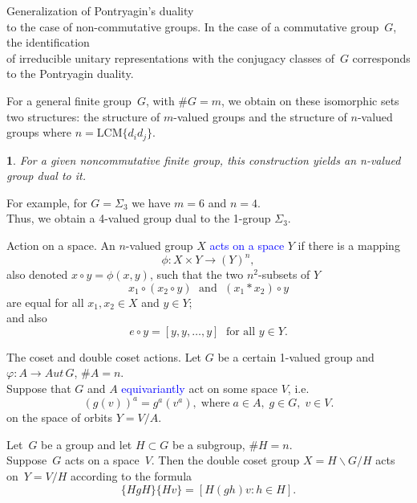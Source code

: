 \documentclass{beamer}
\newtheorem*{fr}{}
\def\blue#1{\textcolor{blue}{#1}}
\begin{document}
\begin{frame}{Generalization of Pontryagin's duality\\ to the case of non-commutative groups.}
In the case of a commutative group~$G$, the identification\\ of
irreducible unitary representations with the conjugacy classes
of~$G$ corresponds to the Pontryagin duality.
\vspace{0.4cm}

For a general finite group~$G$, with $\#G=m$, we obtain on these isomorphic sets two
structures: the structure of $m$-valued groups and the structure of $n$-valued groups where $n=\text{LCM}\{ d_id_j \}$.\\[2pt]
\begin{fr}
For a given noncommutative finite group, this construction yields an n-valued group dual to it.
\end{fr}
For example, for $G=\Sigma_3$ we have $m=6$ and $n=4$.\\ Thus, we obtain a 4-valued group dual to the 1-group $\Sigma_3$.
\end{frame}




\begin{frame}{Action on a space.}
An $n$-valued group $X$ \blue{acts on a space} $Y$ if there is a mapping
\[
\phi\colon X\times Y\to (Y)^n,
\]
also denoted $x\circ y=\phi(x,y)$, such that the two $n^2$-subsets of $Y$
\[
x_1\circ(x_2\circ y)\;\text{ and }\;(x_1*x_2)\circ y
\]
are equal for all $x_1,x_2\in X$ and $y\in Y$;\\[4pt]
and also
\[
e\circ y=[y,y,\dots,y]\; \text{ for all } y\in Y.
\]
\end{frame}




\begin{frame}{The coset and double coset actions.}
Let $G$ be a certain 1-valued group and $\varphi : A \to Aut\,G$, $\# A=n$.\\
Suppose that $G$ and $A$ \blue{equivariantly} act  on some space $V$, i.e.
\[
(g(v))^a= g^a(v^a),\; \text{where} \; a\in A, \; g\in G, \; v\in V.
\]
on the space of orbits $Y=V/A$.
\vspace{0.2cm}

Let~$G$ be a group and let $H \subset G$ be a subgroup, $\# H=n$.\\
Suppose~$G$ acts on a space~$V$.\; Then the double coset group $X=H \backslash G/H$ acts on~$Y=V/H$ according to the formula
\[
\{HgH\}\{Hv\} = [H(gh)v : h \in H].
\]
\end{frame}
\end{document}
